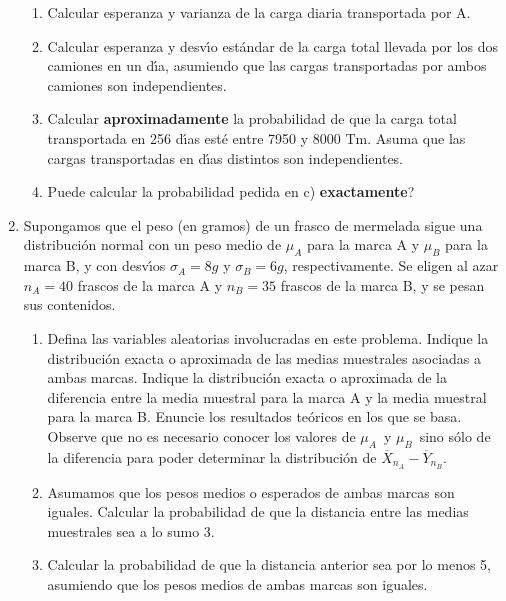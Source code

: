 \documentclass[11pt,a4paper,twoside]{article}%
\begin{document}
\begin{enumerate}
\begin{enumerate}
\item Calcular esperanza y varianza de la carga diaria transportada por A.

\item Calcular esperanza y desv\'{\i}o est\'{a}ndar de la carga total llevada
por los dos camiones en un d\'{\i}a, asumiendo que las cargas transportadas
por ambos camiones son independientes.

\item Calcular \textbf{aproximadamente} la probabilidad de que la carga total
transportada en 256 d\'{\i}as est\'{e} entre 7950 y 8000 Tm.  Asuma que las
cargas transportadas en d\'{\i}as distintos son independientes.

\item \textquestiondown Puede calcular la probabilidad pedida en c)
\textbf{exactamente}?
\end{enumerate}

\item Supongamos que el peso (en gramos) de un frasco de mermelada sigue una
distribuci\'{o}n normal con un peso medio de $\mu_{A}$ para la marca A y
$\mu_{B}$ para la marca B, y con desv\'{\i}os $\sigma_{A}=8g$ y $\sigma
_{B}=6g$, respectivamente. Se eligen al azar $n_{A}=40$ frascos de la marca A
y $n_{B}=35$ frascos de la marca B, y se pesan sus contenidos.

\begin{enumerate}
\item Defina las variables aleatorias involucradas en este problema. Indique
la distribuci\'{o}n exacta o aproximada de las medias muestrales asociadas a
ambas marcas. Indique la distribuci\'{o}n exacta o aproximada de la diferencia
entre la media muestral para la marca A y la media muestral para la marca B.
Enuncie los resultados te\'{o}ricos en los que se basa. Observe que no es
necesario conocer los valores de $\mu_{A}$\ y $\mu_{B}$\ sino s\'{o}lo de la
diferencia para poder determinar la distribuci\'{o}n de $\overline{X}_{n_{A}%
}-\overline{Y}_{n_{B}}.$

\item Asumamos que los pesos medios o esperados de ambas marcas son iguales.
Calcular la probabilidad de que la distancia entre las medias muestrales sea a
lo sumo 3.

\item Calcular la probabilidad de que la distancia anterior sea por lo menos 5,
asumiendo que los pesos medios de ambas marcas son iguales.


\end{enumerate}
\end{enumerate}
\end{document}
